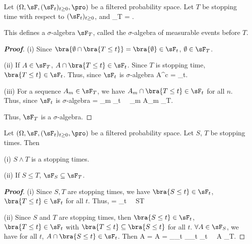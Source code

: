 \begin{definition}\label{def:sigma_algebra_stopping_time_continuous}
Let $(\Omega,\sF, (\sF_t)_{t\geq 0},\pro)$ be a filtered probability space. Let $T$ be stopping time with respect to $(\sF_t)_{t\geq 0}$, and
\be
\sF_T = .
\ee

This defines a $\sigma$-algebra $\sF_T$, called the $\sigma$-algebra of measurable events before $T$.
\end{definition}

\begin{proof}[\bf Proof]
\ben
\item [(i)] Since $\bra{\emptyset \cap \bra{T\leq t}} = \bra{\emptyset} \in \sF_t$, $\emptyset \in \sF_T$.
\item [(ii)] If $A\in \sF_T$, $A \cap \bra{T\leq t} \in \sF_t$. Since $T$ is stopping time, $\bra{T\leq t}\in \sF_t$. Thus, since $\sF_t$ is $\sigma$-algebra
\be
A^c \cap {} =  \bs {} \in \sF_t.
\ee
\item [(iii)] For a sequence $A_m \in \sF_T$, we have $A_m \cap \bra{T\leq t}\in \sF_t$ for all $n$. Thus, since $\sF_t$ is $\sigma$-algebra
\be
{} \cap {} = \bigcup_m  \in \sF_t  \ \ra \ \bigcup_m A_m \in \sF_T.
\ee
\een

Thus, $\sF_T$ is a $\sigma$-algebra.
\end{proof}

\begin{proposition}\label{pro:stopping_time_property_continuous}
Let $(\Omega,\sF, (\sF_t)_{t\geq 0},\pro)$ be a filtered probability space. Let $S$, $T$ be stopping times. Then
\ben
\item [(i)] $S \land T$ is a stopping times.
\item [(ii)] If $S\leq T$, $\sF_S \subseteq \sF_T$.
\een
\end{proposition}

\begin{proof}[\bf Proof]
\ben
\item [(i)] Since $S,T$ are stopping times, we have $\bra{S \leq t} \in \sF_t$, $\bra{T \leq t} \in \sF_t$ for all $t$. Thus,
\be
{} =  \cup {} \in \sF_t \ \ra \ S\land T 
\ee

\item [(ii)] Since $S$ and $T$ are stopping times, then $\bra{S \leq t}\in \sF_t$, $\bra{T \leq t}\in \sF_t$ with $\bra{T\leq t} \subseteq \bra{S\leq t}$ for all $t$. $\forall A \in \sF_S$, we have for all $t$, $A \cap \bra{S \leq t} \in \sF_t$. Then
\be
A \cap {} = A \cap {} = _{\in \sF_t} \cap {}_{\in \sF_t} \in \sF_t \ \ra \ A \in \sF_T.
\ee
\een
\end{proof}

